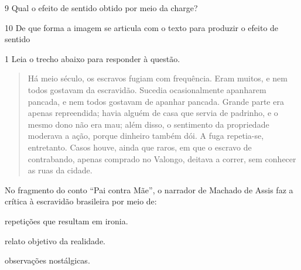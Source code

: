 {\num{9} Qual o efeito de sentido obtido por meio da charge? 


\num{10} De que forma a imagem se articula com o texto para produzir
o efeito de sentido



\num{1} Leia o trecho abaixo para responder à questão. 

\begin{quote}

Há meio século, os escravos fugiam com frequência. Eram muitos, e nem todos
gostavam da escravidão. Sucedia ocasionalmente apanharem pancada, e nem todos
gostavam de apanhar pancada. Grande parte era apenas repreendida; havia alguém de
casa que servia de padrinho, e o mesmo dono não era mau; além disso, o sentimento da
propriedade moderava a ação, porque dinheiro também dói. A fuga repetia-se,
entretanto. Casos houve, ainda que raros, em que o escravo de contrabando, apenas
comprado no Valongo, deitava a correr, sem conhecer as ruas da cidade.

\end{quote}


No fragmento do conto ``Pai contra Mãe'', o narrador de Machado de Assis faz a crítica
à escravidão brasileira por meio de:

\begin{escolha}

  \item repetições que resultam em ironia.
  
  \item relato objetivo da realidade.
  
  \item observações nostálgicas. 
  

\end{escolha}}
